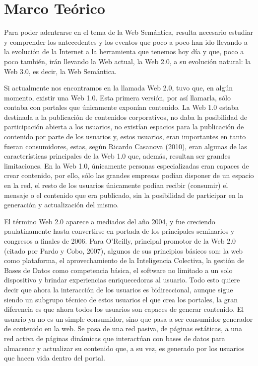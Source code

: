 \chapter{Marco Teórico}
\label{chap:marcoTeorico}

Para poder adentrarse en el tema de la Web Semántica, resulta necesario estudiar y comprender los antecedentes y los eventos que poco a poco han ido llevando a la evolución de la Internet a la herramienta que tenemos hoy día y que, poco a poco también, irán llevando la Web actual, la Web 2.0, a su evolución natural: la Web 3.0, es decir, la Web Semántica.

Si actualmente nos encontramos en la llamada Web 2.0, tuvo que, en algún momento, existir una Web 1.0. Esta primera versión, por así llamarla, sólo contaba con portales que únicamente exponían contenido. La Web 1.0 estaba destinada a la publicación de contenidos corporativos, no daba la posibilidad de participación abierta a los usuarios, no existían espacios para la publicación de contenido por parte de los usuarios y, estos usuarios, eran importantes en tanto fueran consumidores, estas, según Ricardo Casanova (2010), eran algunas de las características principales de la Web 1.0 que, además, resultan ser grandes limitaciones. En la Web 1.0, únicamente personas especializadas eran capaces de crear contenido, por ello, sólo las grandes empresas podían disponer de un espacio en la red, el resto de los usuarios únicamente podían recibir (consumir) el mensaje o el contenido que era publicado, sin la posibilidad de participar en la generación y actualización del mismo.

El término Web 2.0 aparece a mediados del año 2004, y fue creciendo paulatinamente hasta convertirse en portada de los principales seminarios y congresos a finales de 2006. Para O'Reilly, principal promotor de la Web 2.0 (citado por Pardo y Cobo, 2007), algunos de sus principios básicos son: la web como plataforma, el aprovechamiento de la Inteligencia Colectiva, la gestión de Bases de Datos como competencia básica, el software no limitado a un solo dispositivo y brindar experiencias enriquecedoras al usuario. Todo esto quiere decir que ahora la interacción de los usuarios es bidireccional, aunque sigue siendo un subgrupo técnico de estos usuarios el que crea los portales, la gran diferencia es que ahora todos los usuarios son capaces de generar contenido. El usuario ya no es un simple consumidor, sino que pasa a ser consumidor-generador de contenido en la web. Se pasa de una red pasiva, de páginas estáticas, a una red activa de páginas dinámicas que interactúan con bases de datos para almacenar y actualizar su contenido que, a su vez, es generado por los usuarios que hacen vida dentro del portal.

